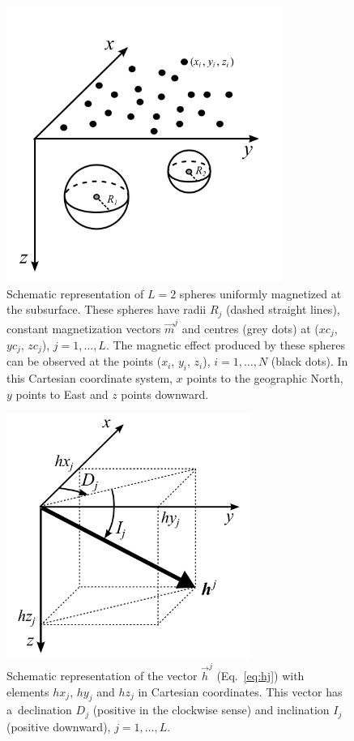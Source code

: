 \documentclass[journal abbreviation, npg]{copernicus}
\begin{document}

\begin{figure}[t]
\includegraphics[width=90mm]{Figures/npgd-2014-0069-f01}
\caption{Schematic representation of $L = 2$ spheres uniformly
  magnetized at the subsurface. These spheres have radii $R_{j}$
  (dashed straight lines), constant magnetization vectors
  $\vec{m}^{j}$ and centres (grey dots) at ($xc_{j}$, $yc_{j}$, $zc_{j}$),
  $j = 1, \ldots, L$. The magnetic effect produced by these spheres
  can be observed at the points ($x_{i}$, $y_{i}$, $z_{i}$), $i = 1,
  \ldots, N$ (black dots). In this Cartesian coordinate system, $x$
  points to the geographic North, $y$ points to East and $z$ points
  downward.}
\label{fig:geometric-aspects}
\end{figure}

\begin{figure}[t]
\includegraphics[width=80mm]{Figures/npgd-2014-0069-f02}
\caption{Schematic representation of the vector $\vec{h}^{j}$
  (Eq.~\ref{eq:hj}) with elements $hx_{j}$, $hy_{j}$ and $hz_{j}$ in
  Cartesian coordinates. This vector has a~declination $D_{j}$
  (positive in the clockwise sense) and inclination $I_{j}$ (positive
  downward), $j = 1, \ldots, L$.}
\label{fig:spherical-coordinates}
\end{figure}
\end{document}
